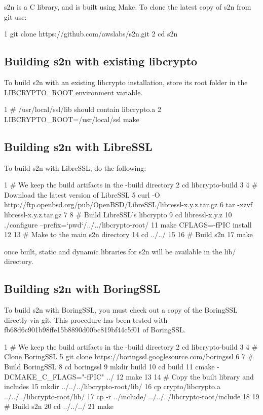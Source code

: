 s2n is a C library, and is built using Make. To clone the latest copy of s2n from git use\+:


\begin{DoxyCode}
1 git clone https://github.com/awslabs/s2n.git
2 cd s2n
\end{DoxyCode}


\subsection*{Building s2n with existing libcrypto}

To build s2n with an existing libcrypto installation, store its root folder in the {\ttfamily L\+I\+B\+C\+R\+Y\+P\+T\+O\+\_\+\+R\+O\+OT} environment variable. 
\begin{DoxyCode}
1 # /usr/local/ssl/lib should contain libcrypto.a
2 LIBCRYPTO\_ROOT=/usr/local/ssl make
\end{DoxyCode}


\subsection*{Building s2n with Libre\+S\+SL}

To build s2n with Libre\+S\+SL, do the following\+:


\begin{DoxyCode}
1 # We keep the build artifacts in the -build directory
2 cd libcrypto-build
3 
4 # Download the latest version of LibreSSL
5 curl -O http://ftp.openbsd.org/pub/OpenBSD/LibreSSL/libressl-x.y.z.tar.gz
6 tar -xzvf libressl-x.y.z.tar.gz
7 
8 # Build LibreSSL's libcrypto
9 cd libressl-x.y.z
10 ./configure --prefix=`pwd`/../../libcrypto-root/
11 make CFLAGS=-fPIC install
12 
13 # Make to the main s2n directory
14 cd ../../
15 
16 # Build s2n
17 make
\end{DoxyCode}


once built, static and dynamic libraries for s2n will be available in the lib/ directory.

\subsection*{Building s2n with Boring\+S\+SL}

To build s2n with Boring\+S\+SL, you must check out a copy of the Boring\+S\+SL directly via git. This procedure has been tested with fb68d6c901b98ffe15b8890d00bc819bf44c5f01 of Boring\+S\+SL.


\begin{DoxyCode}
1 # We keep the build artifacts in the -build directory
2 cd libcrypto-build
3 
4 # Clone BoringSSL
5 git clone https://boringssl.googlesource.com/boringssl
6 
7 # Build BoringSSL
8 cd boringssl
9 mkdir build
10 cd build
11 cmake -DCMAKE\_C\_FLAGS="-fPIC" ../
12 make
13 
14 # Copy the built library and includes
15 mkdir ../../../libcrypto-root/lib/
16 cp crypto/libcrypto.a ../../../libcrypto-root/lib/
17 cp -r ../include/ ../../../libcrypto-root/include
18 
19 # Build s2n
20 cd ../../../
21 make
\end{DoxyCode}


